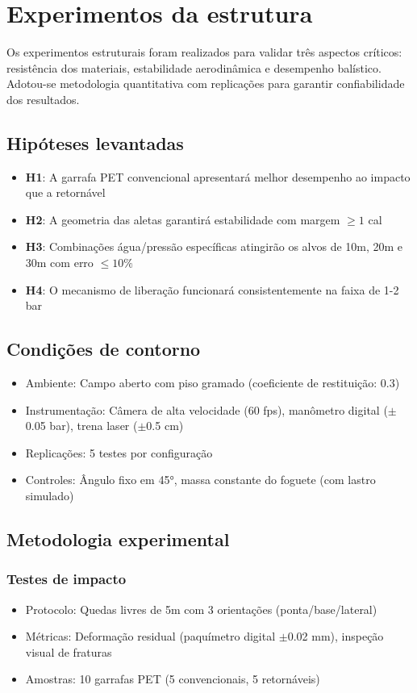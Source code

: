 \section{Experimentos da estrutura}

Os experimentos estruturais foram realizados para validar três aspectos críticos: resistência dos materiais, estabilidade aerodinâmica e desempenho balístico. Adotou-se metodologia quantitativa com replicações para garantir confiabilidade dos resultados.

\subsection{Hipóteses levantadas}
\begin{itemize}
    \item \textbf{H1}: A garrafa PET convencional apresentará melhor desempenho ao impacto que a retornável
    \item \textbf{H2}: A geometria das aletas garantirá estabilidade com margem $\geq 1$ cal
    \item \textbf{H3}: Combinações água/pressão específicas atingirão os alvos de 10m, 20m e 30m com erro $\leq 10\%$
    \item \textbf{H4}: O mecanismo de liberação funcionará consistentemente na faixa de 1-2 bar
\end{itemize}

\subsection{Condições de contorno}
\begin{itemize}
    \item Ambiente: Campo aberto com piso gramado (coeficiente de restituição: 0.3)
    \item Instrumentação: Câmera de alta velocidade (60 fps), manômetro digital ($\pm$0.05 bar), trena laser ($\pm$0.5 cm)
    \item Replicações: 5 testes por configuração
    \item Controles: Ângulo fixo em 45°, massa constante do foguete (com lastro simulado)
\end{itemize}

\subsection{Metodologia experimental}
\subsubsection{Testes de impacto}
\begin{itemize}
    \item Protocolo: Quedas livres de 5m com 3 orientações (ponta/base/lateral)
    \item Métricas: Deformação residual (paquímetro digital $\pm$0.02 mm), inspeção visual de fraturas
    \item Amostras: 10 garrafas PET (5 convencionais, 5 retornáveis)
\end{itemize}


